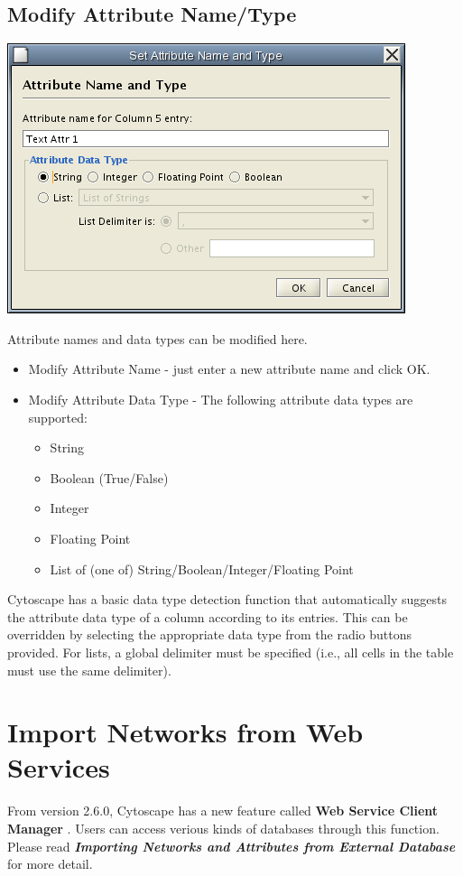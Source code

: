 \subsection{Modify Attribute Name/Type}

\begin{center}
 \includegraphics[wdith=\textwidth]{images/network_table_attr_dialog1.png} 
\end{center}

 Attribute names and data types can be modified here. 
\begin{itemize}
\item Modify Attribute Name - just enter a new attribute name and click OK. 
\item Modify Attribute Data Type - The following attribute data types are supported: \begin{itemize}
\item String 
\item Boolean (True/False) 
\item Integer 
\item Floating Point 
\item List of (one of) String/Boolean/Integer/Floating Point 
\end{itemize}
\end{itemize}
 Cytoscape has a basic data type detection function that automatically suggests the attribute data type of a column according to its entries. This can be overridden by selecting the appropriate data type from the radio buttons provided. For lists, a global delimiter must be specified (i.e., all cells in the table must use the same delimiter). 

\section{Import Networks from Web Services}
 From version 2.6.0, Cytoscape has a new feature called \textbf{Web Service Client Manager}
. Users can access verious kinds of databases through this function. Please read \emph{\textbf{Importing Networks and Attributes from External Database}
}
 for more detail. 

